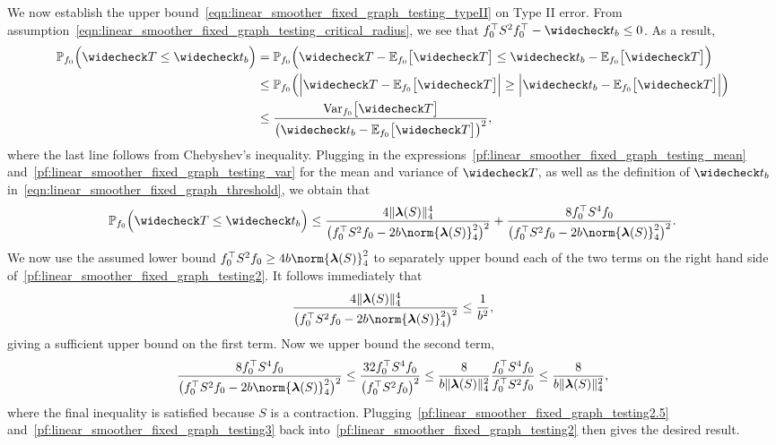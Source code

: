 We now establish the upper bound~\eqref{eqn:linear_smoother_fixed_graph_testing_typeII} on Type II error. From assumption~\eqref{eqn:linear_smoother_fixed_graph_testing_critical_radius}, we see that $f_0^{\top} S^2 f_0^{\top} - \wc{t}_b \leq 0$. As a result,
\begin{align*}
\Pbb_{f_0}\Bigl(\wc{T} \leq \wc{t}_b\Bigr) & = \Pbb_{f_0}\Bigl(\wc{T} - \Ebb_{f_0}\bigl[\wc{T}\bigr] \leq \wc{t}_b - \Ebb_{f_0}\bigl[\wc{T}\bigr]\Bigr) \\ 
& \leq \Pbb_{f_0}\Bigl(\Bigl|\wc{T} - \Ebb_{f_0}\bigl[\wc{T}\bigr]\Bigr| \geq \Bigl|\wc{t}_b - \Ebb_{f_0}\bigl[\wc{T}\bigr]\Bigr|\Bigr) \\ 
& \leq \frac{\Var_{f_0}\bigl[\wc{T}\bigr]}{\bigl(\wc{t}_b - \Ebb_{f_0}\bigl[\wc{T}\bigr]\bigr)^2},
\end{align*}
where the last line follows from Chebyshev's inequality. Plugging in the expressions~\eqref{pf:linear_smoother_fixed_graph_testing_mean} and~\eqref{pf:linear_smoother_fixed_graph_testing_var} for the mean and variance of $\wc{T}$, as well as the definition of $\wc{t}_b$ in~\eqref{eqn:linear_smoother_fixed_graph_threshold}, we obtain that
\begin{equation}
\label{pf:linear_smoother_fixed_graph_testing2}
\Pbb_{f_0}\Bigl(\wc{T} \leq \wc{t}_b\Bigr) \leq \frac{4\|\lambdavec(S)\|_4^4}{\bigl(f_0^{\top}S^2f_0 - 2b \norm{\lambdavec(S)}_4^2\bigr)^2} + \frac{8f_0^{\top}S^4f_0 }{\bigl(f_0^{\top}S^2f_0 - 2b \norm{\lambdavec(S)}_4^2\bigr)^2}.
\end{equation}
We now use the assumed lower bound $f_0^{\top} S^2 f_0 \geq 4b \norm{\lambdavec(S)}_4^2$ to separately upper bound each of the two terms on the right hand side of~\eqref{pf:linear_smoother_fixed_graph_testing2}. It follows immediately that
\begin{equation}
\label{pf:linear_smoother_fixed_graph_testing2.5}
\frac{4 \|\lambdavec(S)\|_4^4}{\bigl(f_0^{\top}S^2f_0 - 2b \norm{\lambdavec(S)}_4^2\bigr)^2} \leq \frac{1}{b^2},
\end{equation}
giving a sufficient upper bound on the first term. Now we upper bound the second term,
\begin{equation}
\label{pf:linear_smoother_fixed_graph_testing3}
\frac{8f_0^{\top}S^4f_0 }{\bigl(f_0^{\top}S^2f_0 - 2b \norm{\lambdavec(S)}_4^2\bigr)^2} \leq \frac{32 f_0^{\top}S^4f_0 }{\bigl(f_0^{\top}S^2f_0\bigr)^2} \leq \frac{8}{b \|\lambdavec(S)\|_4^2} \frac{f_0^{\top}S^4f_0 }{f_0^{\top}S^2f_0} \leq \frac{8}{b \|\lambdavec(S)\|_4^2},
\end{equation}
where the final inequality is satisfied because $S$ is a contraction. Plugging~\eqref{pf:linear_smoother_fixed_graph_testing2.5} and~\eqref{pf:linear_smoother_fixed_graph_testing3} back into~\eqref{pf:linear_smoother_fixed_graph_testing2} then gives the desired result.\\
 \\
